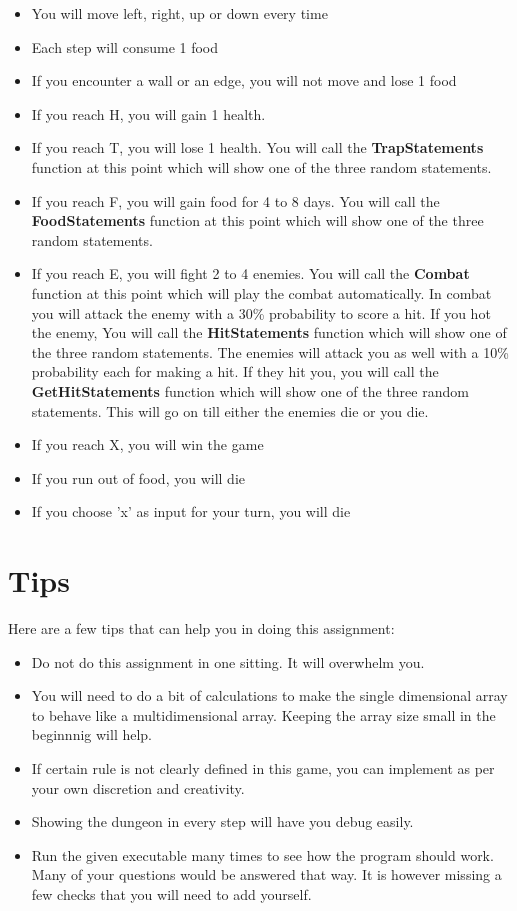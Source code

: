 \documentclass[a4paper,12pt]{article}
\begin{document}
\begin{itemize}
	\item You will move left, right, up or down every time
	\item Each step will consume 1 food
	\item If you encounter a wall or an edge, you will not move and lose 1 food
	\item If you reach H, you will gain 1 health.
	\item If you reach T, you will lose 1 health. You will call the \textbf{TrapStatements} function at this point which will show one of the three random statements.
	\item If you reach F, you will gain food for 4 to 8 days. You will call the \textbf{FoodStatements} function at this point which will show one of the three random statements.
	\item If you reach E, you will fight 2 to 4 enemies. You will call the \textbf{Combat} function at this point which will play the combat automatically. In combat you will attack the enemy with a 30\% probability to score a hit. If you hot the enemy,  You will call the \textbf{HitStatements} function which will show one of the three random statements. The enemies will attack you as well with a 10\% probability each for making a hit. If they hit you, you will call the \textbf{GetHitStatements} function which will show one of the three random statements. This will go on till either the enemies die or you die.
	\item If you reach X, you will win the game
	\item If you run out of food, you will die
	\item If you choose 'x' as input for your turn, you will die
\end{itemize}

\section{Tips}
Here are a few tips that can help you in doing this assignment:

\begin{itemize}
	\item Do not do this assignment in one sitting. It will overwhelm you.
	\item You will need to do a bit of calculations to make the single dimensional array to behave like a multidimensional array. Keeping the array size small in the beginnnig will help.
	\item If certain rule is not clearly defined in this game, you can implement as per your own discretion and creativity.
	      
	\item Showing the dungeon in every step will have you debug easily.
	\item Run the given executable many times to see how the program should work. Many of your questions would be answered that way. It is however missing a few checks that you will need to add yourself.
\end{itemize}
\end{document}
